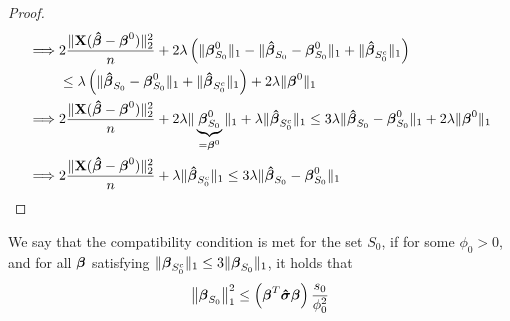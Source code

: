 \begin{proof}
\begin{align*}
        \implies & 2 \frac{\| \mathbf{X} (\boldsymbol{\hat{\beta}}-\boldsymbol{\beta}^{0})\|_{2}^{2}}{n} + 2 \lambda \left( \|\boldsymbol{\beta}_{S_{0}}^{0} \|_{1} - \|\boldsymbol{\hat{\beta}}_{S_{0}}-\boldsymbol{\beta}_{S_{0}}^{0} \|_{1}+ \|\boldsymbol{\hat{\beta}}_{S_{0}^{c}} \|_{1} \right)                                                               \\
                 & \leq \lambda \left( \| \boldsymbol{\hat{\beta}}_{S_{0}}-\boldsymbol{\beta}_{S_{0}}^{0} \|_{1} + \|\boldsymbol{\hat{\beta}}_{S_{0}^{c}} \|_{1} \right) + 2 \lambda \|\boldsymbol{\beta}^{0} \|_{1}                                                                                                         \\
        \implies & 2 \frac{\| \mathbf{X} (\boldsymbol{\hat{\beta}}-\boldsymbol{\beta}^{0})\|_{2}^{2}}{n} + 2 \lambda \|\underbrace{\boldsymbol{\beta}_{S_{0}}^{0}}_{= \boldsymbol{\beta}^0} \|_{1} + \lambda \|\boldsymbol{\hat{\beta}}_{S_{0}^{c}} \|_{1} \leq 3 \lambda \| \boldsymbol{\hat{\beta}}_{S_{0}}-\boldsymbol{\beta}_{S_{0}}^{0} \|_{1} + 2 \lambda \|\boldsymbol{\beta}^{0} \|_{1} \\
        \implies & 2\frac{ \|\mathbf{X} (\boldsymbol{\hat{\beta}}-\boldsymbol{\beta}^{0} ) \|_{2}^{2}}{n} + \lambda \|\boldsymbol{\hat{\beta}}_{S_{0}^{c}} \|_{1} \leq 3 \lambda \|\boldsymbol{\hat{\beta}}_{S_{0}}-\boldsymbol{\beta}_{S_{0}}^{0} \|_{1}
    \end{align*}
\end{proof}

\begin{definition}
    We say that the compatibility condition is met for the set $S_{0}$, if for some $\phi_{0}>0$, and for all $\boldsymbol{\beta}$ satisfying $ \|\boldsymbol{\beta}_{S_{0}^{c}} \|_{1} \leq 3 \|\boldsymbol{\beta}_{S_{0}} \|_{1}$, it holds that
    \begin{equation}
        \left\| \boldsymbol{\beta}_{S_{0}} \right\|_{1}^{2} \leq \left(\boldsymbol{\beta}^{T} \boldsymbol{\hat{\sigma}} \boldsymbol{\beta}\right) \frac{s_{0}}{\phi_{0}^{2}}
    \end{equation}
\end{definition}

